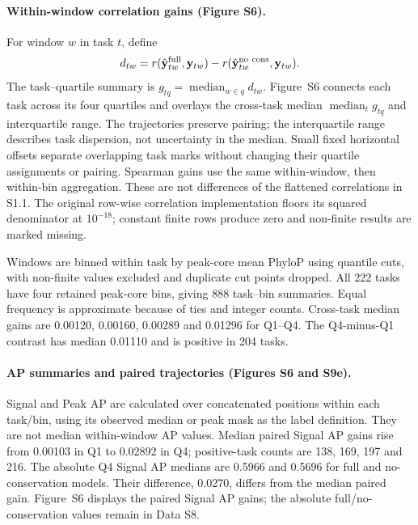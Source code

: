 \documentclass[11pt]{article}
\begin{document}
\paragraph{Within-window correlation gains (Figure S6).} For window $w$ in task $t$, define
\begin{equation}
d_{tw}=r(\hat{\mathbf y}^{\rm full}_{tw},\mathbf y_{tw})-
r(\hat{\mathbf y}^{\rm no\ cons}_{tw},\mathbf y_{tw}).
\end{equation}
The task--quartile summary is $g_{tq}=\operatorname{median}_{w\in q}d_{tw}$. Figure~S6 connects each task across its four quartiles and overlays the cross-task median $\operatorname{median}_t g_{tq}$ and interquartile range. The trajectories preserve pairing; the interquartile range describes task dispersion, not uncertainty in the median. Small fixed horizontal offsets separate overlapping task marks without changing their quartile assignments or pairing. Spearman gains use the same within-window, then within-bin aggregation. These are not differences of the flattened correlations in S1.1. The original row-wise correlation implementation floors its squared denominator at $10^{-18}$; constant finite rows produce zero and non-finite results are marked missing.

Windows are binned within task by peak-core mean PhyloP using quantile cuts, with non-finite values excluded and duplicate cut points dropped. All 222 tasks have four retained peak-core bins, giving 888 task--bin summaries. Equal frequency is approximate because of ties and integer counts. Cross-task median gains are 0.00120, 0.00160, 0.00289 and 0.01296 for Q1--Q4. The Q4-minus-Q1 contrast has median 0.01110 and is positive in 204 tasks.

\paragraph{AP summaries and paired trajectories (Figures S6 and S9e).} Signal and Peak AP are calculated over concatenated positions within each task/bin, using its observed median or peak mask as the label definition. They are not median within-window AP values. Median paired Signal AP gains rise from 0.00103 in Q1 to 0.02892 in Q4; positive-task counts are 138, 169, 197 and 216. The absolute Q4 Signal AP medians are 0.5966 and 0.5696 for full and no-conservation models. Their difference, 0.0270, differs from the median paired gain. Figure~S6 displays the paired Signal AP gains; the absolute full/no-conservation values remain in Data S8.
\end{document}
